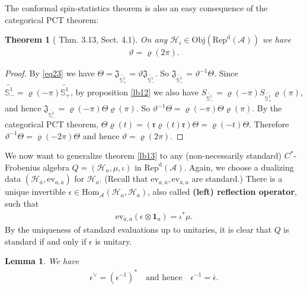 \documentclass[12pt,a4paper]{article}
\theoremstyle{definition}
\theoremstyle{plain}
\newtheorem{thm}[df]{Theorem}
\newtheorem{lm}[df]{Lemma}
\newcommand{\fk}{\mathfrak}
\newcommand{\mc}{\mathcal}
\newcommand{\wtd}{\widetilde}
\newcommand{\ovl}{\overline}
\newcommand{\id}{\mathbf{1}}
\newcommand{\Hom}{\mathrm{Hom}}
\newcommand{\ev}{\mathrm{ev}}
\newcommand{\RepdA}{\mathrm{Rep}^{\mathrm d}(\mc A)}
\newcommand{\mbb}{\mathbb}
\newcommand{\Obj}{\mathrm{Obj}}
\numberwithin{equation}{section}
\begin{document}
The conformal spin-statistics theorem is also an easy consequence of the categorical PCT theorem:

\begin{thm}[\cite{GL96} Thm. 3.13, \cite{Joer96} Sect. 4.1]\label{lb20}
On any $\mc H_i\in\Obj(\RepdA)$ we have
\begin{align}
\vartheta=\varrho(2\pi).
\end{align}
\end{thm}

\begin{proof}
By \eqref{eq23} we have $\Theta=\fk J_{\wtd{\mbb S^1_+}}=\vartheta\fk J_{\wtd{\mbb S^1_-}}$. So $\fk J_{\wtd{\mbb S^1_-}}=\vartheta^{-1}\Theta$. Since $\wtd{\mbb S^1_-}=\varrho(-\pi)\wtd{\mbb S^1_+}$, by proposition \ref{lb12} we also have $S_{\wtd{\mbb S^1_-}}=\varrho(-\pi)S_{\wtd{\mbb S^1_+}}\varrho(\pi)$, and hence $\fk J_{\wtd{\mbb S^1_-}}=\varrho(-\pi)\Theta\varrho(\pi)$. So $\vartheta^{-1}\Theta=\varrho(-\pi)\Theta\varrho(\pi)$. By the categorical PCT theorem, $\Theta\varrho(t)=(\fk r\varrho(t)\fk r)\Theta=\varrho(-t)\Theta$. Therefore $\vartheta^{-1}\Theta=\varrho(-2\pi)\Theta$ and hence $\vartheta=\varrho(2\pi)$.
\end{proof}




We now want to generalize theorem \ref{lb13} to any (non-necessarily standard) $C^*$-Frobenius algebra $Q=(\mc H_a,\mu,\iota)$ in $\RepdA$. Again, we choose a dualizing data $(\mc H_{\ovl a},\ev_{a,\ovl a})$ for $\mc H_a$. (Recall that $\ev_{a,\ovl a},\ev_{\ovl a,a}$ are standard.) There is a unique invertible $\epsilon\in\Hom_{\mc A}(\mc H_a,\mc H_{\ovl a})$, also called \textbf{(left) reflection operator}, such that
\begin{align}
\ev_{\ovl a,a}(\epsilon\otimes\id_a)=\iota^*\mu.\label{eq67}
\end{align}
By the uniqueness of standard evaluations up to unitaries, it is clear that $Q$ is standard if and only if $\epsilon$ is unitary.

\begin{lm}
We have
\begin{align}
	\epsilon^\vee=(\epsilon^{-1})^*\quad\text{and hence}\quad\epsilon^{-1}=\ovl\epsilon.\label{eq44}
\end{align}
\end{lm}
\end{document}

